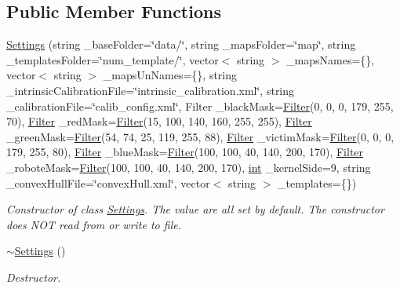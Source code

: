 \subsection*{Public Member Functions}
\begin{DoxyCompactItemize}
\item 
\mbox{\hyperlink{class_settings_a716069efb4808f2c395dfa218ec1c540}{Settings}} (string \+\_\+base\+Folder=\char`\"{}data/\char`\"{}, string \+\_\+maps\+Folder=\char`\"{}map\char`\"{}, string \+\_\+templates\+Folder=\char`\"{}num\+\_\+template/\char`\"{}, vector$<$ string $>$ \+\_\+maps\+Names=\{\}, vector$<$ string $>$ \+\_\+maps\+Un\+Names=\{\}, string \+\_\+intrinsic\+Calibration\+File=\char`\"{}intrinsic\+\_\+calibration.\+xml\char`\"{}, string \+\_\+calibration\+File=\char`\"{}calib\+\_\+config.\+xml\char`\"{}, Filter \+\_\+black\+Mask=\mbox{\hyperlink{class_filter}{Filter}}(0, 0, 0, 179, 255, 70), \mbox{\hyperlink{class_filter}{Filter}} \+\_\+red\+Mask=\mbox{\hyperlink{class_filter}{Filter}}(15, 100, 140, 160, 255, 255), \mbox{\hyperlink{class_filter}{Filter}} \+\_\+green\+Mask=\mbox{\hyperlink{class_filter}{Filter}}(54, 74, 25, 119, 255, 88), \mbox{\hyperlink{class_filter}{Filter}} \+\_\+victim\+Mask=\mbox{\hyperlink{class_filter}{Filter}}(0, 0, 0, 179, 255, 80), \mbox{\hyperlink{class_filter}{Filter}} \+\_\+blue\+Mask=\mbox{\hyperlink{class_filter}{Filter}}(100, 100, 40, 140, 200, 170), \mbox{\hyperlink{class_filter}{Filter}} \+\_\+robote\+Mask=\mbox{\hyperlink{class_filter}{Filter}}(100, 100, 40, 140, 200, 170), \mbox{\hyperlink{draw_8hh_aa620a13339ac3a1177c86edc549fda9b}{int}} \+\_\+kernel\+Side=9, string \+\_\+convex\+Hull\+File=\char`\"{}convex\+Hull.\+xml\char`\"{}, vector$<$ string $>$ \+\_\+templates=\{\})
\begin{DoxyCompactList}\small\item\em Constructor of class \mbox{\hyperlink{class_settings}{Settings}}. The value are all set by default. The constructor does N\+OT read from or write to file. \end{DoxyCompactList}\item 
\mbox{\hyperlink{class_settings_a4a65be5921dfc9fddc476e5320541d89}{$\sim$\+Settings}} ()
\begin{DoxyCompactList}\small\item\em Destructor. \end{DoxyCompactList}\item 

\end{DoxyCompactItemize}
